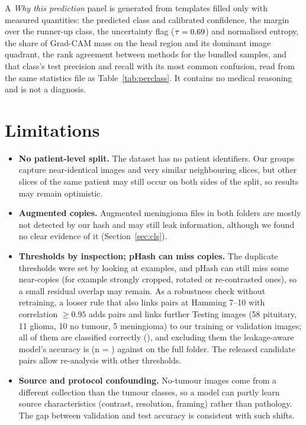 \documentclass[11pt,a4paper]{article}
\begin{document}
A \emph{Why this prediction} panel is generated from templates filled only with measured quantities: the predicted class and calibrated confidence, the margin over the runner-up class, the uncertainty flag ($\tau=0.69{}$) and normalised entropy, the share of Grad-CAM mass on the head region and its dominant image quadrant, the rank agreement between methods for the bundled samples, and that class's test precision and recall with its most common confusion, read from the same statistics file as Table~\ref{tab:perclass}. It contains no medical reasoning and is not a diagnosis.

\section{Limitations}\label{sec:lim}
\begin{itemize}
\item \textbf{No patient-level split.} The dataset has no patient identifiers. Our groups capture near-identical images and very similar neighbouring slices, but other slices of the same patient may still occur on both sides of the split, so results may remain optimistic.
\item \textbf{Augmented copies.} Augmented meningioma files in both folders are mostly not detected by our hash and may still leak information, although we found no clear evidence of it (Section~\ref{sec:cls}).
\item \textbf{Thresholds by inspection; pHash can miss copies.} The duplicate thresholds were set by looking at examples, and pHash can still miss some near-copies (for example strongly cropped, rotated or re-contrasted ones), so a small residual overlap may remain. As a robustness check without retraining, a looser rule that also links pairs at Hamming 7--10 with correlation $\ge 0.95$ adds \SensExtraPairs{} pairs and links \SensExtraTest{} further Testing images (58 pituitary, 11 glioma, 10 no tumour, 5 meningioma) to our training or validation images; all of them are classified correctly (\SensAccOnExtra{}), and excluding them the leakage-aware model's accuracy is \SensAccExcl{} (n = \SensNExcl{}) against \AccCFull{} on the full folder. The released candidate pairs allow re-analysis with other thresholds.
\item \textbf{Source and protocol confounding.} No-tumour images come from a different collection than the tumour classes, so a model can partly learn source characteristics (contrast, resolution, framing) rather than pathology. The gap between validation and test accuracy is consistent with such shifts.

\end{itemize}
\end{document}
